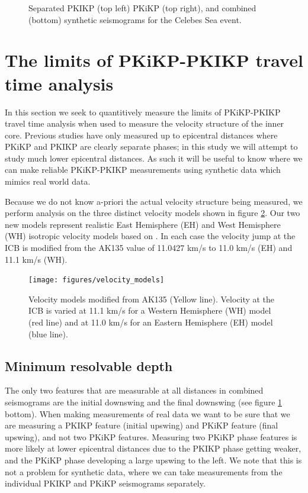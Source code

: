 \documentclass[11pt,a4paper]{article}
\begin{document}
\begin{figure}
	\caption{Separated PKIKP (top left) PKiKP (top right), and combined (bottom) synthetic seismograms for the Celebes Sea event.}
	\label{fig:Synth aligned}
\end{figure}

\section{The limits of PKiKP-PKIKP travel time analysis}
\label{sec:Limits}

In this section we seek to quantitively measure the limits of PKiKP-PKIKP travel time analysis when used to measure the velocity structure of the inner core. Previous studies have only measured up to epicentral distances where PKiKP and PKIKP are clearly separate phases; in this study we will attempt to study much lower epicentral distances. As such it will be useful to know where we can make reliable PKiKP-PKIKP measurements using synthetic data which mimics real world data.

Because we do not know a-priori the actual velocity structure being measured, we perform analysis on the three distinct velocity models shown in figure \ref{fig:Velocity models}. Our two new models represent realistic East Hemisphere (EH) and West Hemisphere (WH) isotropic velocity models based on \cite{Waszek2011a}. In each case the velocity jump at the ICB is modified from the AK135 value of 11.0427 km/s to 11.0 km/s (EH) and 11.1 km/s (WH).

\begin{figure}
	\centering
	\texttt{[image: figures/velocity\_models]}
	\caption{Velocity models modified from AK135 (Yellow line). Velocity at the ICB is varied at 11.1 km/s for a Western Hemisphere (WH) model (red line) and at 11.0 km/s for an Eastern Hemisphere (EH) model (blue line).}
	\label{fig:Velocity models}
\end{figure}

\subsection{Minimum resolvable depth}
The only two features that are measurable at all distances in combined seismograms are the initial downswing and the final downswing (see figure \ref{fig:Synth aligned} bottom). When making measurements of real data we want to be sure that we are measuring a PKIKP feature (initial upswing) and PKiKP feature (final upswing), and not two PKiKP features. Measuring two PKiKP phase features is more likely at lower epicentral distances due to the PKIKP phase getting weaker, and the PKiKP phase developing a large upswing to the left. We note that this is not a problem for synthetic data, where we can take measurements from the individual PKIKP and PKiKP seismograms separately.
\end{document}
